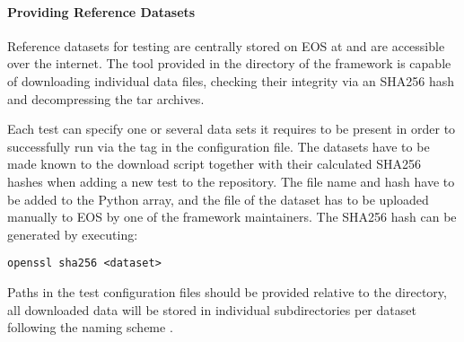 \paragraph{Providing Reference Datasets}

Reference datasets for testing are centrally stored on EOS at  and are accessible over the internet. The  tool provided in the  directory of the framework is capable of downloading individual data files, checking their integrity via an SHA256 hash and decompressing the tar archives.

Each test can specify one or several data sets it requires to be present in order to successfully run via the  tag in the configuration file. The datasets have to be made known to the download script together with their calculated SHA256 hashes when adding a new test to the repository. The file name and hash have to be added to the Python  array, and the file of the dataset has to be uploaded manually to EOS by one of the framework maintainers. The SHA256 hash can be generated by executing:
\begin{verbatim}
openssl sha256 <dataset>
\end{verbatim}

Paths in the test configuration files should be provided relative to the  directory, all downloaded data will be stored in individual subdirectories per dataset following the naming scheme .
